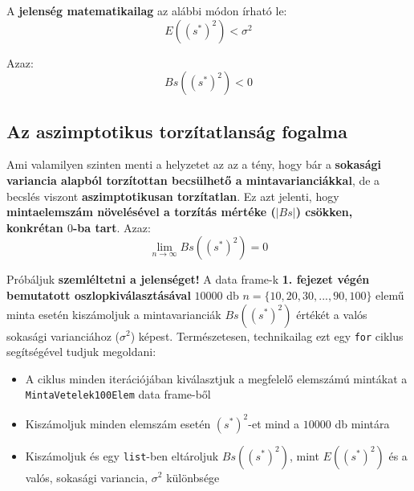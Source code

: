 \documentclass[
]{book}
\providecommand{\tightlist}{%
  \setlength{\itemsep}{0pt}\setlength{\parskip}{0pt}}
\begin{document}
A \textbf{jelenség matematikailag} az alábbi módon írható le: \[E\left({(s^*)}^2 \right) < \sigma^2\]

Azaz: \[Bs\left({(s^*)}^2\right) < 0\]

\subsection{Az aszimptotikus torzítatlanság fogalma}\label{az-aszimptotikus-torzuxedtatlansuxe1g-fogalma}

Ami valamilyen szinten menti a helyzetet az az a tény, hogy bár a \textbf{sokasági variancia alapból torzítottan becsülhető a mintavarianciákkal}, de a becslés viszont \textbf{aszimptotikusan torzítatlan}. Ez azt jelenti, hogy \textbf{mintaelemszám növelésével a torzítás mértéke (\(|Bs|\)) csökken, konkrétan \(0\)-ba tart}. Azaz: \[\lim_{n \rightarrow \infty}{Bs\left({(s^*)}^2\right)}=0\]

Próbáljuk \textbf{szemléltetni a jelenséget!} A data frame-k \textbf{1. fejezet végén bemutatott oszlopkiválasztásával} \(10000\) db \(n=\{10,20,30,...,90,100\}\) elemű minta esetén kiszámoljuk a mintavarianciák \(Bs({(s^*)}^2)\) értékét a valós sokasági varianciához (\(\sigma^2\)) képest.
Természetesen, technikailag ezt egy \texttt{for} ciklus segítségével tudjuk megoldani:

\begin{itemize}
\tightlist
\item
  A ciklus minden iterációjában kiválasztjuk a megfelelő elemszámú mintákat a \texttt{MintaVetelek100Elem} data frame-ből
\item
  Kiszámoljuk minden elemszám esetén \({(s^*)}^2\)-et mind a \(10000\) db mintára
\item
  Kiszámoljuk és egy \texttt{list}-ben eltároljuk \(Bs({(s^*)}^2)\), mint \(E({(s^*)}^2)\) és a valós, sokasági variancia, \(\sigma^2\) különbsége
\end{itemize}
\end{document}
